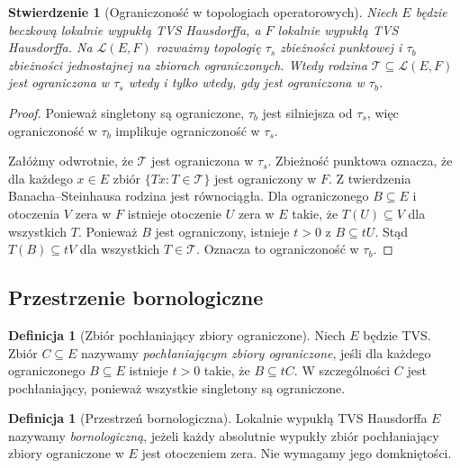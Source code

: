 \documentclass[11pt,a4paper]{article}
\numberwithin{equation}{section}
\theoremstyle{plain}
\newtheorem{stwierdzenie}[twierdzenie]{Stwierdzenie}
\theoremstyle{definition}
\newtheorem{definicja}[twierdzenie]{Definicja}
\theoremstyle{remark}
\begin{document}
\begin{stwierdzenie}[Ograniczoność w topologiach operatorowych]
\label{prop:sot-bot-bounded}
Niech $E$ będzie beczkową lokalnie wypukłą TVS Hausdorffa,
a $F$ lokalnie wypukłą TVS Hausdorffa. Na $\mathcal L(E,F)$
rozważmy topologię $\tau_s$ zbieżności punktowej i
$\tau_b$ zbieżności jednostajnej na zbiorach ograniczonych.
Wtedy rodzina $\mathcal T\subseteq\mathcal L(E,F)$
jest ograniczona w $\tau_s$ wtedy i tylko wtedy,
gdy jest ograniczona w $\tau_b$.
\end{stwierdzenie}
\begin{proof}
Ponieważ singletony są ograniczone, $\tau_b$ jest
silniejsza od $\tau_s$, więc ograniczoność w $\tau_b$
implikuje ograniczoność w $\tau_s$.

Załóżmy odwrotnie, że $\mathcal T$ jest ograniczona
w $\tau_s$. Zbieżność punktowa oznacza, że dla każdego
$x\in E$ zbiór $\{Tx:T\in\mathcal T\}$ jest ograniczony
w $F$. Z twierdzenia Banacha--Steinhausa rodzina jest
równociągła. Dla ograniczonego $B\subseteq E$ i otoczenia
$V$ zera w $F$ istnieje otoczenie $U$ zera w $E$
takie, że $T(U)\subseteq V$ dla wszystkich $T$.
Ponieważ $B$ jest ograniczony, istnieje $t>0$
z $B\subseteq tU$. Stąd $T(B)\subseteq tV$ dla wszystkich
$T\in\mathcal T$. Oznacza to ograniczoność w $\tau_b$.
\end{proof}

\subsection{Przestrzenie bornologiczne}

\begin{definicja}[Zbiór pochłaniający zbiory ograniczone]
\label{def:bornivorous}
Niech $E$ będzie TVS. Zbiór $C\subseteq E$ nazywamy
\emph{pochłaniającym zbiory ograniczone}, jeśli dla każdego
ograniczonego $B\subseteq E$ istnieje $t>0$ takie, że
$B\subseteq tC$. W szczególności $C$ jest pochłaniający,
ponieważ wszystkie singletony są ograniczone.
\end{definicja}

\begin{definicja}[Przestrzeń bornologiczna]\label{def:bornological}
Lokalnie wypukłą TVS Hausdorffa $E$ nazywamy
\emph{bornologiczną}, jeżeli każdy absolutnie wypukły
zbiór pochłaniający zbiory ograniczone w $E$ jest
otoczeniem zera. Nie wymagamy jego domkniętości.
\end{definicja}
\end{document}
